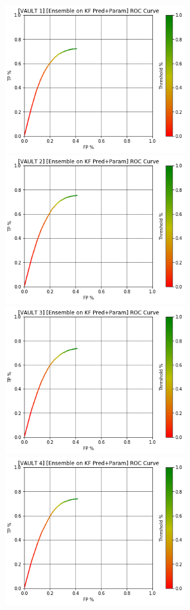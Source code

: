\begin{figure}[h]
\centering
\includegraphics[width=8cm]{body/results/Graphs/JustSeries/2.PerformanceofEnsemble/1.KF/Raw/v1.png}
\includegraphics[width=8cm]{body/results/Graphs/JustSeries/2.PerformanceofEnsemble/1.KF/Raw/v2.png}
\includegraphics[width=8cm]{body/results/Graphs/JustSeries/2.PerformanceofEnsemble/1.KF/Raw/v3.png}
\includegraphics[width=8cm]{body/results/Graphs/JustSeries/2.PerformanceofEnsemble/1.KF/Raw/v4.png}

\end{figure}
